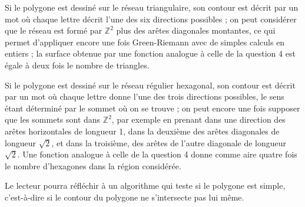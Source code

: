 

\Q
Si le polygone est dessiné sur le réseau triangulaire, son contour est décrit par un mot où chaque lettre décrit l'une des six directions possibles ; on peut considérer que le réseau est formé par $\mathbb{Z}^2$ plus des arêtes diagonales montantes, ce qui permet d'appliquer encore une fois Green-Riemann avec de simples calculs en entiers ; la surface obtenue par une fonction analogue à celle de la question 4 est égale à deux fois le nombre de triangles.
\medskip

Si le polygone est dessiné sur le réseau régulier hexagonal, son contour est décrit par un mot où chaque lettre donne l'une des trois directions possibles, le sens étant déterminé par le sommet où on se trouve ; on peut encore une fois supposer que les sommets sont dans $\mathbb{Z}^2$, par exemple en prenant dans une direction des arêtes horizontales de longueur 1, dans la deuxième des arêtes diagonales de longueur $\sqrt{2}$, et dans la troisième, des arêtes de l'autre diagonale de longueur $\sqrt{2}$. Une fonction analogue à celle de la question 4 donne comme aire quatre fois le nombre d'hexagones dans la région considérée.
\medskip

Le lecteur pourra réfléchir à un algorithme qui teste si le polygone est simple, c'est-à-dire si le contour du polygone ne s'intersecte pas lui même.
\bigskip

\Fin
